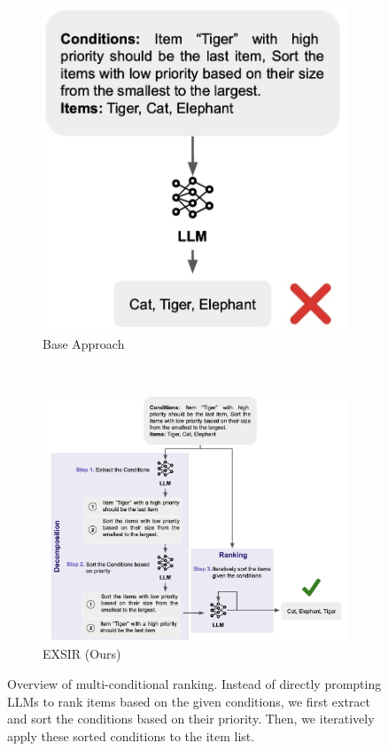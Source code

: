 \begin{figure}[th!]
    \centering
    \begin{subfigure}[b]{0.24\textwidth}
        \centering
        \includegraphics[width=\linewidth]{submissions/Estevam2024/figures/overview-base.jpg}  
        \caption{Base Approach}
    \end{subfigure}%
    ~ 
    \begin{subfigure}[b]{0.65\textwidth}
        \centering
        \includegraphics[width=\linewidth]{submissions/Estevam2024/figures/overview-exsir.jpg}
        \caption{EXSIR (Ours)}
    \end{subfigure}  
    \caption{Overview of multi-conditional ranking. Instead of directly prompting LLMs to rank items based on the given conditions, we first extract and sort the conditions based on their priority. Then, we iteratively apply these sorted conditions to the item list.}
    \label{fig:mcr}
\end{figure}

